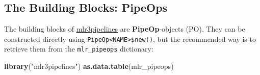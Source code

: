 \documentclass[]{article}
\newenvironment{Shaded}{\begin{snugshade}}{\end{snugshade}}
\newcommand{\KeywordTok}[1]{\textcolor[rgb]{0.13,0.29,0.53}{\textbf{#1}}}
\newcommand{\NormalTok}[1]{#1}
\newcommand{\StringTok}[1]{\textcolor[rgb]{0.31,0.60,0.02}{#1}}
\renewenvironment{Shaded} {\begin{snugshade}\small} {\end{snugshade}}
\begin{document}
\hypertarget{the-building-blocks-pipeops}{%
\subsection{The Building Blocks: PipeOps}\label{the-building-blocks-pipeops}}

The building blocks of \href{https://mlr3pipelines.mlr-org.com}{mlr3pipelines} are \textbf{PipeOp}-objects (PO).
They can be constructed directly using \texttt{PipeOp\textless{}NAME\textgreater{}\$new()}, but the recommended way is to retrieve them from the \texttt{mlr\_pipeops} dictionary:

\begin{Shaded}
\begin{Highlighting}[]
\KeywordTok{library}\NormalTok{(}\StringTok{"mlr3pipelines"}\NormalTok{)}
\KeywordTok{as.data.table}\NormalTok{(mlr_pipeops)}
\end{Highlighting}
\end{Shaded}
\end{document}
